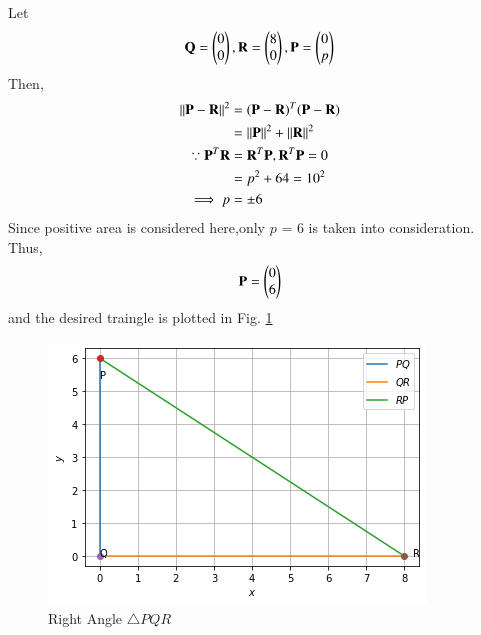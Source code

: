 Let 
%
\begin{align}
\mathbf{Q} = \begin{pmatrix}0\\0\end{pmatrix}, \mathbf{R} = \begin{pmatrix}8\\0\end{pmatrix}, \mathbf{P} = \begin{pmatrix}0\\p\end{pmatrix}
\end{align}
%
Then,
\begin{align}
\left\lVert\mathbf{P}-\mathbf{R}\right\rVert^2 &= ({\mathbf{P}-\mathbf{R}})^T({\mathbf{P}-\mathbf{R}})
\\
&= \left\lVert\mathbf{P}\right\rVert^2 + \left\lVert\mathbf{R}\right\rVert^2 
\\
\because \mathbf{P}^T\mathbf{R} &= \mathbf{R}^T\mathbf{P}, \mathbf{R}^T\mathbf{P}=0
\\
&= p^2 + 64 = 10^2
 \\
\implies p &=\pm 6
\end{align}
Since positive area is considered here,only $p$ = 6 is taken into consideration. Thus, 
\begin{align}
    \mathbf{P} = \begin{pmatrix}0\\6\end{pmatrix}
    \end{align}
    and the desired traingle is plotted in Fig. \ref{constr/24/fig:right_angle_triangle}
%
\begin{figure}[!ht]
\centering
\includegraphics[width=\columnwidth]{solutions/24/Figure1.png}
\caption{Right Angle $\triangle PQR$}
\label{constr/24/fig:right_angle_triangle}	
\end{figure}
